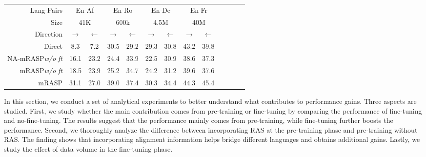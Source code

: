 \documentclass[11pt,a4paper]{article}
\newcommand{\mf}[1]{\multicolumn{2}{c}{ #1}}
\newcommand{\smf}[1]{\multicolumn{2}{c}{#1}}
\newcommand{\method}{mRASP\xspace}
\newcommand{\baseline}{Direct}
\begin{document}
\begin{table*}[ht]
\centering
\begin{tabular}{rcccccccccccc}
\toprule


Lang-Pairs& 
\mf{En-Af} &
\mf{En-Ro} &
\mf{En-De} &
\mf{En-Fr} & 

\\



Size &
\smf{41K}  & 
\smf{600k}  & 
\smf{4.5M} & 
\smf{40M} & 

\\


 Direction & 
 $\rightarrow$ &$\leftarrow$ &

 $\rightarrow$ &$\leftarrow$ &

 $\rightarrow$ &$\leftarrow$ &

 $\rightarrow$ &$\leftarrow$ \\




\midrule
\baseline &
8.3 & 7.2 & 30.5 & 29.2 &  29.3 & 30.8 & 43.2 & 39.8 

\\

 NA-\method \textit{w/o ft} &
 16.1 &  23.2 &
 24.4 &  33.9 &
22.5 &  30.9 &
 38.6 & 37.3

\\

\midrule

 \method \textit{w/o ft} &
 18.5 &  23.9 &
 25.2 &  34.7 &
 24.2 &  31.2 &
 39.6 & 37.6

\\

 \method &
 31.1 &  27.0 &
  39.0 & 37.4 &
 30.3 &  34.4 &
 44.3 & 45.4  

\\




\bottomrule
\end{tabular}
\caption{
MT performance of \method with and without the RAS technique and fine-tuning strategy. 
\method includes both the RAS technique and fine-tuning strategy. We report tokenized BLEU for this experiment.
``\textit{w/o ft}'' denotes ``without fine-tuning''. 
We also report \method without fine-tuning and RAS to compare with \method without fine-tuning. 
Both RAS and fine-tuning proves effective and essential for \method. 
} 
\label{tab:No-tune-Compare}
\end{table*} 
In this section, we conduct a set of analytical experiments to better understand what contributes to performance gains. Three aspects are studied. 
First, we study whether the main contribution comes from pre-training or fine-tuning by comparing the performance of fine-tuning and no-fine-tuning. The results suggest that the performance mainly comes from pre-training, while fine-tuning further boosts the performance. Second, we thoroughly analyze the difference between incorporating RAS at the pre-training phase and pre-training without RAS. The finding shows that incorporating alignment information helps bridge different languages and obtains additional gains.
Lastly, we study the effect of data volume in the fine-tuning phase.
\end{document}
